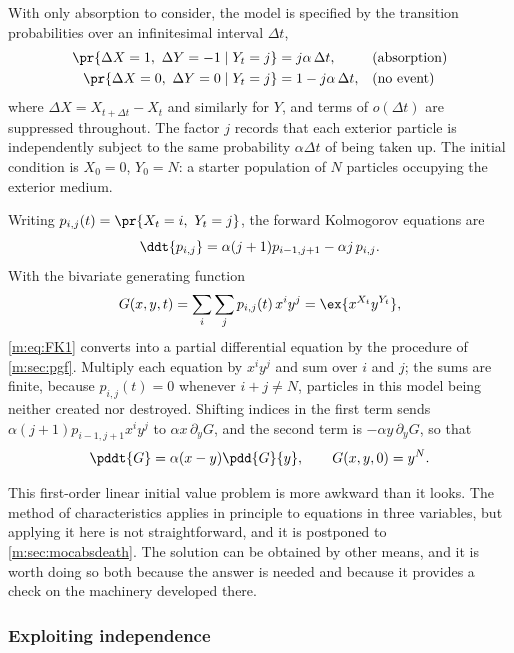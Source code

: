 With only absorption to consider, the model is specified by the transition
probabilities over an infinitesimal interval $\Delta t$,
\begin{align*}
\pr{\Delta X = 1,\ \Delta Y = -1 \mid Y_t = j} &= j\alpha\,\Delta t, &&\text{(absorption)}\\
\pr{\Delta X = 0,\ \Delta Y = 0 \mid Y_t = j} &= 1-j\alpha\,\Delta t, &&\text{(no event)}
\end{align*}
where $\Delta X = X_{t+\Delta t}-X_t$ and similarly for $Y$, and terms of
$o(\Delta t)$ are suppressed throughout. The factor $j$ records that each exterior
particle is independently subject to the same probability $\alpha\Delta t$ of being
taken up. The initial condition is $X_0=0$, $Y_0=N$: a starter population of $N$
particles occupying the exterior medium.

Writing $p_{i,j}(t) = \pr{X_t=i,\ Y_t=j}$, the forward Kolmogorov equations are
\begin{equation}
\label{m:eq:FK1}
\ddt{p_{i,j}} = \alpha(j+1)p_{i-1,j+1} - \alpha j\,p_{i,j} .
\end{equation}
With the bivariate generating function
\begin{equation}
\label{m:eq:pgfDef}
G(x,y,t) = \sum_i\sum_j p_{i,j}(t)\,x^iy^j = \ex{x^{X_t}y^{Y_t}},
\end{equation}
\cref{m:eq:FK1} converts into a partial differential equation by the procedure of
\cref{m:sec:pgf}. Multiply each equation by $x^iy^j$ and sum over $i$ and $j$; the
sums are finite, because $p_{i,j}(t)=0$ whenever $i+j\neq N$, particles in this
model being neither created nor destroyed. Shifting indices in the first term
sends $\alpha(j+1)p_{i-1,j+1}x^iy^j$ to $\alpha x\,\partial_yG$, and the second
term is $-\alpha y\,\partial_yG$, so that
\begin{equation}
\label{m:eq:PDE1}
\pddt{G} = \alpha(x-y)\pdd{G}{y},
\qquad G(x,y,0) = y^N .
\end{equation}

This first-order linear initial value problem is more awkward than it looks. The
method of characteristics applies in principle to equations in three variables, but
applying it here is not straightforward, and it is postponed to
\cref{m:sec:mocabsdeath}. The solution can be obtained by other means, and it is
worth doing so both because the answer is needed and because it provides a check on
the machinery developed there.

\subsubsection*{Exploiting independence}

